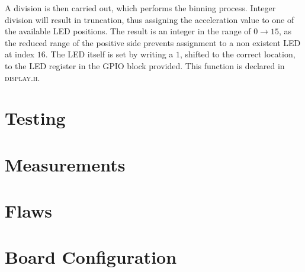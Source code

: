 \documentclass[11pt,british]{report}
\begin{document}
A division is then carried out, which performs the binning process. Integer division will result in truncation, thus assigning the acceleration value to one of the available LED positions.
The result is an integer in the range of $0\rightarrow 15$, as the reduced range of the positive side prevents assignment to a non existent LED at index $16$. The LED itself is set by writing a $1$, shifted to the correct location, to the LED register in the GPIO block provided. This function is declared in \textsc{display.h}.



\section*{Testing}

\section*{Measurements}

\section*{Flaws}

\section*{Board Configuration}
\end{document}
